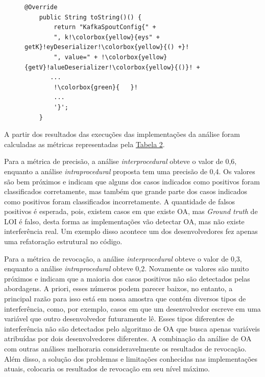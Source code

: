\begin{figure}[h]
    \begin{lstlisting}[escapechar=!]
    @Override
    public String toString()() {
        return "KafkaSpoutConfig{" +
        ", k!\colorbox{yellow}{eys" + getK}!eyDeserializer!\colorbox{yellow}{() +}!
        ", value=" + !\colorbox{yellow}{getV}!alueDeserializer!\colorbox{yellow}{()}! +
       ...
        !\colorbox{green}{   }!
        ...
        '}';
    }
    \end{lstlisting}
    \caption{}
    \label{fig:ad2be67}
    \centering
\end{figure}

A partir dos resultados das execuções das implementações da análise foram calculadas as métricas representadas pela \hyperref[tab:metrics-loi]{Tabela 2}.

Para a métrica de precisão, a análise \emph{interprocedural} obteve o valor de 0,6, enquanto a análise \emph{intraprocedural} proposta tem uma precisão de 0,4. Os valores são bem próximos e indicam que alguns dos casos indicados como positivos foram classificados corretamente, mas também que grande parte dos casos indicados como positivos foram classificados incorretamente. A quantidade de falsos positivos é esperada, pois, existem casos em que existe OA,
mas \emph{Ground truth} de LOI é falso, desta forma as implementações vão detectar OA, mas não existe interferência real. Um exemplo disso acontece um dos desenvolvedores fez apenas uma refatoração estrutural no código.

Para a métrica de revocação, a análise \emph{interprocedural} obteve o valor de 0,3, enquanto a análise \emph{intraprocedural} obteve 0,2. Novamente os valores são muito próximos e indicam que a maioria dos casos positivos não são detectados pelas abordagens. A priori, esses números podem parecer baixos, no entanto, a principal razão para isso está em nossa amostra que contém diversos tipos de interferência, como, por exemplo, casos em que um desenvolvedor escreve em uma variável que outro desenvolvedor futuramente lê. Esses tipos diferentes de interferência não são detectados pelo algoritmo de OA que busca apenas variáveis atribuídas por dois desenvolvedores diferentes. A combinação da análise de OA com outras análises melhoraria consideravelmente os resultados de revocação. Além disso, a solução dos problemas e limitações conhecidas nas implementações atuais, colocaria os resultados de revocação em seu nível máximo. 

